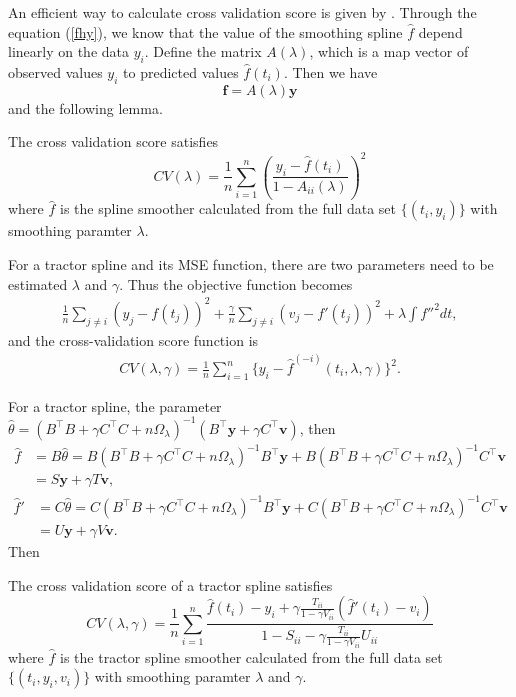 An efficient way to calculate cross validation score is given by \cite{green1993nonparametric}. Through the equation (\ref{fhy}), we know that the value of the smoothing spline $\hat{f}$ depend linearly on the data $y_i$. Define the matrix $A(\lambda)$, which is a map vector of observed values $y_i$ to predicted values $\hat{f}(t_i)$. Then we have
\begin{equation}
\mathbf{f}=A(\lambda)\mathbf{y}
\end{equation}
and the following lemma.
\begin{lemma}
The cross validation score satisfies
\begin{equation}
CV(\lambda)=\frac{1}{n} \sum_{i=1}^n(\frac{y_i-\hat{f}(t_i)}{1-A_{ii}(\lambda)})^2
\end{equation}
where $\hat{f}$ is the spline smoother calculated from the full data set $\{(t_i,y_i)\}$ with smoothing paramter $\lambda$.
\end{lemma}

For a tractor spline and its MSE function, there are two parameters need to be estimated $\lambda$ and $\gamma$. Thus the objective function becomes
\begin{align}
\frac{1}{n}\sum_{j \neq i}(y_j-f(t_j))^2+\frac{\gamma}{n}\sum_{j \neq i}(v_j-f'(t_j))^2+\lambda \int f''^2dt,
\end{align}
and the cross-validation score function is
\begin{align}
CV(\lambda,\gamma)=\frac{1}{n}\sum_{i=1}^{n}\{y_i-\hat{f}^{(-i)}(t_i,\lambda,\gamma)\}^2.
\end{align}

For a tractor spline, the parameter $\hat{\theta}=(B^\top B+\gamma C^\top C+n\Omega_\lambda)^{-1}(B^\top\mathbf{y}+\gamma C^\top\mathbf{v})$, then
\begin{equation}
\begin{split}
 \hat{f}&=B\hat{\theta}=B(B^\top B+\gamma C^\top C+n\Omega_\lambda)^{-1}B^\top\mathbf{y}+B(B^\top B+\gamma C^\top C+n\Omega_\lambda)^{-1}C^\top\mathbf{v}\\&=S\mathbf{y}+\gamma T\mathbf{v},
 \end{split}
 \end{equation}
 \begin{equation}
 \begin{split}
\hat{f}'&=C\hat{\theta}=C(B^\top B+\gamma C^\top C+n\Omega_\lambda)^{-1}B^\top\mathbf{y}+C(B^\top B+\gamma C^\top C+n\Omega_\lambda)^{-1}C^\top\mathbf{v}\\&=U\mathbf{y}+\gamma V\mathbf{v}.
 \end{split}
\end{equation}
Then 
\begin{theorem}\label{cvscore}
The cross validation score of a tractor spline satisfies
\begin{equation}
CV(\lambda,\gamma)=\frac{1}{n}\sum_{i=1}^{n}\frac{\hat{f}(t_i)-y_i+\gamma \frac{T_{ii}}{1-\gamma V_{ii}}(\hat{f}'(t_i)-v_i)}{1-S_{ii}-\gamma\frac{T_{ii}}{1-\gamma V_{ii}}U_{ii}}
\end{equation}
where $\hat{f}$ is the tractor spline smoother calculated from the full data set $\{(t_i,y_i,v_i)\}$ with smoothing paramter $\lambda$ and $\gamma$.
\end{theorem}

